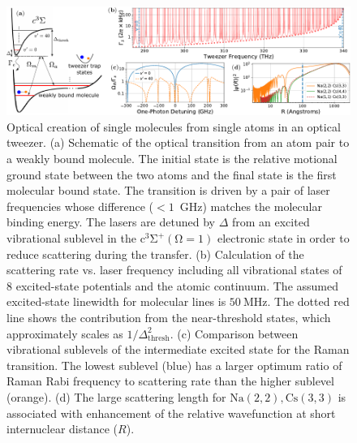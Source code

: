 \documentclass[aps,prx,twocolumn,10pt,superscriptaddress]{revtex4-2}
\newcommand{\Na}{\mathrm{Na}}
\newcommand{\Cs}{\mathrm{Cs}}
\begin{document}
\begin{figure}
  \includegraphics[width=\textwidth]{fig-theory.pdf}
  \caption{Optical creation of single molecules from single atoms in an optical tweezer.
    (a) Schematic of the optical transition from an atom pair to a weakly bound molecule.
    The initial state is the relative motional ground state between the two atoms
    and the final state is the first molecular bound state.
    The transition is driven by a pair of laser frequencies whose difference ($< 1$~GHz) matches the molecular binding energy.
    The lasers are detuned by $\Delta$ from an excited vibrational sublevel
    in the $\mathrm{c^3\Sigma^+(\Omega = 1)}$ electronic state
    in order to reduce scattering during the transfer.
    (b) Calculation of the scattering rate vs. laser frequency
    including all vibrational states of 8 excited-state potentials
    and the atomic continuum.
    The assumed excited-state linewidth for molecular lines is $50~\text{MHz}$.
    The dotted red line shows the contribution from the near-threshold states, which approximately scales as $1/\Delta_{\mathrm{thresh}}^2$.
    (c) Comparison between vibrational sublevels of the intermediate excited state
    for the Raman transition.
    The lowest sublevel (blue)
    has a larger optimum ratio of Raman Rabi frequency to scattering rate
    than the higher sublevel (orange).
    (d) The large scattering length for $\Na(2,2),\Cs(3,3)$ is associated with enhancement of the relative wavefunction at short
    internuclear distance ($R$).
    \label{f-theory}
  }
\end{figure}
\end{document}

